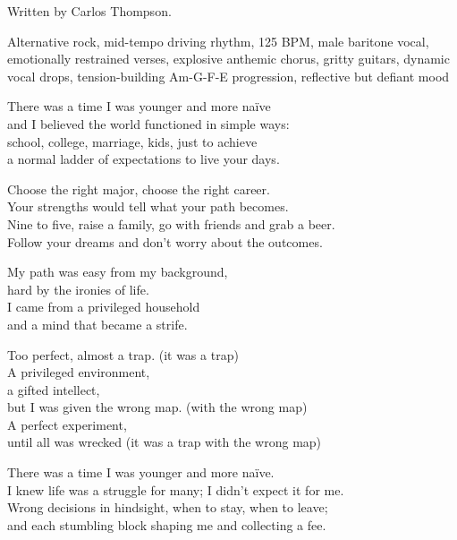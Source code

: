 
\begin{notes}
Written by Carlos Thompson.
\end{notes}
\begin{style}
Alternative rock, mid-tempo driving rhythm, 125 BPM, male baritone vocal, emotionally restrained verses, explosive anthemic chorus, gritty guitars, dynamic vocal drops, tension-building Am-G-F-E progression, reflective but defiant mood
\end{style}
\begin{lyrics}

There was a time I was younger and more naïve\\
and I believed the world functioned in simple ways:\\
school, college, marriage, kids, just to achieve\\
a normal ladder of expectations to live your days.

Choose the right major, choose the right career.\\
Your strengths would tell what your path becomes.\\
Nine to five, raise a family, go with friends and grab a beer.\\
Follow your dreams and don't worry about the outcomes.

My path was easy from my background,\\
hard by the ironies of life.\\
I came from a privileged household\\
and a mind that became a strife.

Too perfect, almost a trap. (it was a trap)\\
A privileged environment,\\
a gifted intellect,\\
but I was given the wrong map. (with the wrong map)\\
A perfect experiment,\\
until all was wrecked
(it was a trap with the wrong map)

There was a time I was younger and more naïve.\\
I knew life was a struggle for many; I didn't expect it for me.\\
Wrong decisions in hindsight, when to stay, when to leave;\\
and each stumbling block shaping me and collecting a fee.


\end{lyrics}
